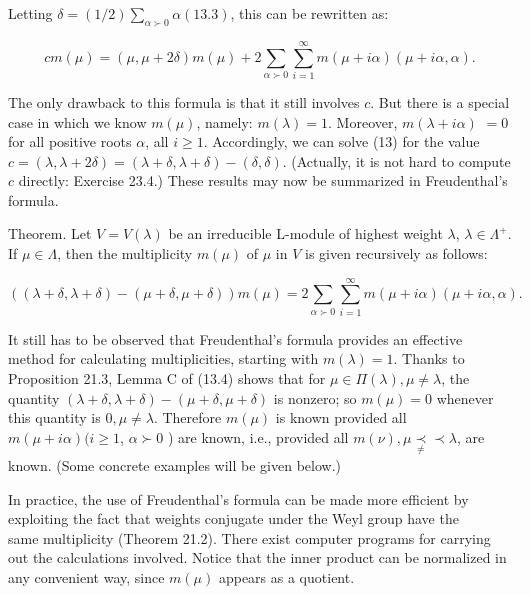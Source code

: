 \documentclass[10pt]{article}
\begin{document}
Letting $\delta=(1 / 2) \sum_{\alpha \succ 0} \alpha(13.3)$, this can be rewritten as:


\begin{equation*}
c m(\mu)=(\mu, \mu+2 \delta) m(\mu)+2 \sum_{\alpha \succ 0} \sum_{i=1}^{\infty} m(\mu+i \alpha)(\mu+i \alpha, \alpha) . \tag{13}
\end{equation*}


The only drawback to this formula is that it still involves $c$. But there is a special case in which we know $m(\mu)$, namely: $m(\lambda)=1$. Moreover, $m(\lambda+i \alpha)$ $=0$ for all positive roots $\alpha$, all $i \geq 1$. Accordingly, we can solve (13) for the value $c=(\lambda, \lambda+2 \delta)=(\lambda+\delta, \lambda+\delta)-(\delta, \delta)$. (Actually, it is not hard to compute $c$ directly: Exercise 23.4.) These results may now be summarized in Freudenthal's formula.

Theorem. Let $V=V(\lambda)$ be an irreducible L-module of highest weight $\lambda$, $\lambda \in \Lambda^{+}$. If $\mu \in \Lambda$, then the multiplicity $m(\mu)$ of $\mu$ in $V$ is given recursively as follows:


\begin{equation*}
((\lambda+\delta, \lambda+\delta)-(\mu+\delta, \mu+\delta)) m(\mu)=2 \sum_{\alpha \succ 0} \sum_{i=1}^{\infty} m(\mu+i \alpha)(\mu+i \alpha, \alpha) . \tag{14}
\end{equation*}


It still has to be observed that Freudenthal's formula provides an effective method for calculating multiplicities, starting with $m(\lambda)=1$. Thanks to Proposition 21.3, Lemma C of (13.4) shows that for $\mu \in \Pi(\lambda), \mu \neq \lambda$, the quantity $(\lambda+\delta, \lambda+\delta)-(\mu+\delta, \mu+\delta)$ is nonzero; so $m(\mu)=0$ whenever this quantity is $0, \mu \neq \lambda$. Therefore $m(\mu)$ is known provided all $m(\mu+i \alpha)(i \geq 1$, $\alpha \succ 0$ ) are known, i.e., provided all $m(\nu), \mu \underset{\neq}{\prec} \prec \lambda$, are known. (Some concrete examples will be given below.)

In practice, the use of Freudenthal's formula can be made more efficient by exploiting the fact that weights conjugate under the Weyl group have the\\
same multiplicity (Theorem 21.2). There exist computer programs for carrying out the calculations involved. Notice that the inner product can be normalized in any convenient way, since $m(\mu)$ appears as a quotient.
\end{document}
